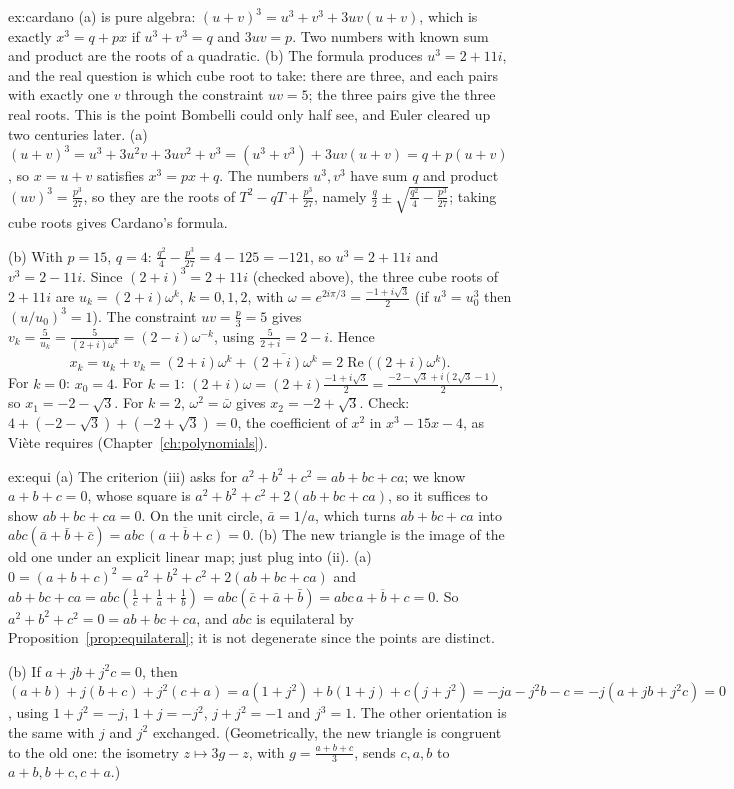 \begin{solution}{ex:cardano}
\idea (a) is pure algebra: $(u+v)^3=u^3+v^3+3uv(u+v)$, which is exactly $x^3=q+px$ if $u^3+v^3=q$ and $3uv=p$. Two numbers with known sum and product are the roots of a quadratic. (b) The formula produces $u^3=2+11i$, and the real question is which cube root to take: there are three, and each pairs with exactly one $v$ through the constraint $uv=5$; the three pairs give the three real roots. This is the point Bombelli could only half see, and Euler cleared up two centuries later.
\writeup (a) $(u+v)^3=u^3+3u^2v+3uv^2+v^3=(u^3+v^3)+3uv(u+v)=q+p(u+v)$, so $x=u+v$ satisfies $x^3=px+q$. The numbers $u^3,v^3$ have sum $q$ and product $(uv)^3=\frac{p^3}{27}$, so they are the roots of $T^2-qT+\frac{p^3}{27}$, namely $\frac q2\pm\sqrt{\frac{q^2}4-\frac{p^3}{27}}$; taking cube roots gives Cardano's formula.

(b) With $p=15$, $q=4$: $\frac{q^2}4-\frac{p^3}{27}=4-125=-121$, so $u^3=2+11i$ and $v^3=2-11i$. Since $(2+i)^3=2+11i$ (checked above), the three cube roots of $2+11i$ are $u_k=(2+i)\omega^k$, $k=0,1,2$, with $\omega=e^{2i\pi/3}=\frac{-1+i\sqrt3}2$ (if $u^3=u_0^3$ then $(u/u_0)^3=1$). The constraint $uv=\frac p3=5$ gives $v_k=\frac5{u_k}=\frac{5}{(2+i)\omega^k}=(2-i)\omega^{-k}$, using $\frac5{2+i}=2-i$. Hence
\[
x_k=u_k+v_k=(2+i)\omega^k+\overline{(2+i)\omega^k}=2\operatorname{Re}\bigl((2+i)\omega^k\bigr).
\]
For $k=0$: $x_0=4$. For $k=1$: $(2+i)\omega=(2+i)\frac{-1+i\sqrt3}2=\frac{-2-\sqrt3+i(2\sqrt3-1)}2$, so $x_1=-2-\sqrt3$. For $k=2$, $\omega^2=\bar\omega$ gives $x_2=-2+\sqrt3$. Check: $4+(-2-\sqrt3)+(-2+\sqrt3)=0$, the coefficient of $x^2$ in $x^3-15x-4$, as Vi\`ete requires (Chapter~\ref{ch:polynomials}).
\end{solution}

\begin{solution}{ex:equi}
\idea (a) The criterion (iii) asks for $a^2+b^2+c^2=ab+bc+ca$; we know $a+b+c=0$, whose square is $a^2+b^2+c^2+2(ab+bc+ca)$, so it suffices to show $ab+bc+ca=0$. On the unit circle, $\bar a=1/a$, which turns $ab+bc+ca$ into $abc(\bar a+\bar b+\bar c)=abc\,\overline{(a+b+c)}=0$. (b) The new triangle is the image of the old one under an explicit linear map; just plug into (ii).
\writeup (a) $0=(a+b+c)^2=a^2+b^2+c^2+2(ab+bc+ca)$ and $ab+bc+ca=abc\left(\frac1c+\frac1a+\frac1b\right)=abc(\bar c+\bar a+\bar b)=abc\,\overline{a+b+c}=0$. So $a^2+b^2+c^2=0=ab+bc+ca$, and $abc$ is equilateral by Proposition~\ref{prop:equilateral}; it is not degenerate since the points are distinct.

(b) If $a+jb+j^2c=0$, then $(a+b)+j(b+c)+j^2(c+a)=a(1+j^2)+b(1+j)+c(j+j^2)=-ja-j^2b-c=-j(a+jb+j^2c)=0$, using $1+j^2=-j$, $1+j=-j^2$, $j+j^2=-1$ and $j^3=1$. The other orientation is the same with $j$ and $j^2$ exchanged. (Geometrically, the new triangle is congruent to the old one: the isometry $z\mapsto3g-z$, with $g=\frac{a+b+c}3$, sends $c,a,b$ to $a+b,b+c,c+a$.)
\end{solution}


